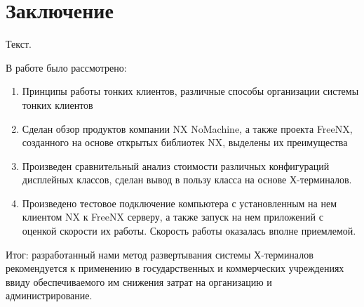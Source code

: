 \chapter*{Заключение}

Текст.

В работе было рассмотрено:
\begin{enumerate}
\item Принципы работы тонких клиентов, различные способы организации
  системы тонких клиентов 
\item Сделан обзор продуктов компании NX NoMachine, а также проекта
  FreeNX, созданного на основе открытых библиотек NX, выделены их
  преимущества
\item Произведен сравнительный анализ стоимости различных конфигураций
  дисплейных классов, сделан вывод в пользу класса на основе Х-терминалов. 
\item Произведено тестовое подключение компьютера с установленным на
  нем клиентом NX к FreeNX серверу, а также запуск на нем приложений с
  оценкой скорости их работы. Скорость работы оказалась вполне
  приемлемой.
\end{enumerate}
Итог: разработанный нами метод развертывания системы Х-терминалов
рекомендуется к применению в государственных и коммерческих учреждениях
ввиду обеспечиваемого им снижения затрат на организацию и администрирование. 


\clearpage



